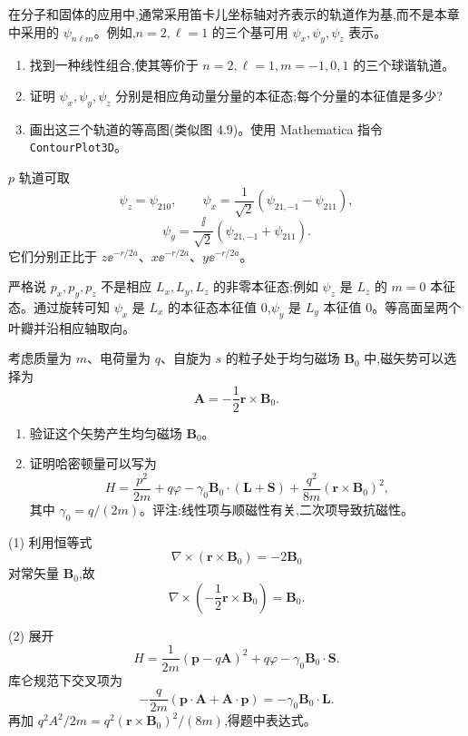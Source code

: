 \begin{question}
在分子和固体的应用中,通常采用笛卡儿坐标轴对齐表示的轨道作为基,而不是本章中采用的 $\psi_{n\ell m}$。例如,$n=2,\ell=1$ 的三个基可用 $\psi_x,\psi_y,\psi_z$ 表示。
\begin{enumerate}
\item 找到一种线性组合,使其等价于 $n=2,\ell=1,m=-1,0,1$ 的三个球谐轨道。
\item 证明 $\psi_x,\psi_y,\psi_z$ 分别是相应角动量分量的本征态;每个分量的本征值是多少?
\item 画出这三个轨道的等高图(类似图 4.9)。使用 Mathematica 指令 \texttt{ContourPlot3D}。
\end{enumerate}
\end{question}
\begin{solution}

$p$ 轨道可取
\[
\psi_z=\psi_{210},
\qquad
\psi_x=\frac{1}{\sqrt2}(\psi_{21,-1}-\psi_{211}),
\]
\[
\psi_y=\frac{\ii}{\sqrt2}(\psi_{21,-1}+\psi_{211}).
\]
它们分别正比于 $z \ee^{-r/2a}$、$x \ee^{-r/2a}$、$y \ee^{-r/2a}$。

严格说 $p_x,p_y,p_z$ 不是相应 $L_x,L_y,L_z$ 的非零本征态;例如 $\psi_z$ 是 $L_z$ 的 $m=0$ 本征态。通过旋转可知 $\psi_x$ 是 $L_x$ 的本征态本征值 0,$\psi_y$ 是 $L_y$ 本征值 0。等高面呈两个叶瓣并沿相应轴取向。

\end{solution}

\begin{question}
考虑质量为 $m$、电荷量为 $q$、自旋为 $s$ 的粒子处于均匀磁场 $\mathbf B_0$ 中,磁矢势可以选择为
\[
\mathbf A=-\frac12\mathbf r\times\mathbf B_0.
\]
\begin{enumerate}
\item 验证这个矢势产生均匀磁场 $\mathbf B_0$。
\item 证明哈密顿量可以写为
\[
H=\frac{p^2}{2m}+q\varphi-\gamma_0\mathbf B_0\cdot(\mathbf L+\mathbf S)+\frac{q^2}{8m}(\mathbf r\times\mathbf B_0)^2,
\]
其中 $\gamma_0=q/(2m)$。评注:线性项与顺磁性有关,二次项导致抗磁性。
\end{enumerate}
\end{question}
\begin{solution}

(1) 利用恒等式
\[
\nabla\times(\mathbf r\times\mathbf B_0)= -2\mathbf B_0
\]
对常矢量 $\mathbf B_0$,故
\[
\nabla\times\left(-\frac12\mathbf r\times\mathbf B_0\right)=\mathbf B_0.
\]

(2) 展开
\[
H=\frac{1}{2m}(\mathbf p-q\mathbf A)^2+q\varphi-\gamma_0\mathbf B_0\cdot\mathbf S.
\]
库仑规范下交叉项为
\[
-\frac{q}{2m}(\mathbf p\cdot\mathbf A+\mathbf A\cdot\mathbf p)=-\gamma_0\mathbf B_0\cdot\mathbf L.
\]
再加 $q^2A^2/2m=q^2(\mathbf r\times\mathbf B_0)^2/(8m)$,得题中表达式。

\end{solution}

